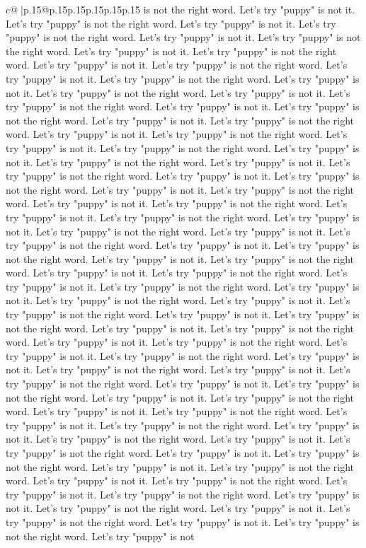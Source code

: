 \documentclass{article}
\begin{document}
{\begin{supertabular}{c@{$\;$}|p{.15\linewidth}@{}p{.15\linewidth}p{.15\linewidth}p{.15\linewidth}p{.15\linewidth}p{.15\linewidth}}
{{{is not the right word. Let's try "puppy" is not it. Let's try "puppy" is not the right word. Let's try "puppy" is not it. Let's try "puppy" is not the right word. Let's try "puppy" is not it. Let's try "puppy" is not the right word. Let's try "puppy" is not it. Let's try "puppy" is not the right word. Let's try "puppy" is not it. Let's try "puppy" is not the right word. Let's try "puppy" is not it. Let's try "puppy" is not the right word. Let's try "puppy" is not it. Let's try "puppy" is not the right word. Let's try "puppy" is not it. Let's try "puppy" is not the right word. Let's try "puppy" is not it. Let's try "puppy" is not the right word. Let's try "puppy" is not it. Let's try "puppy" is not the right word. Let's try "puppy" is not it. Let's try "puppy" is not the right word. Let's try "puppy" is not it. Let's try "puppy" is not the right word. Let's try "puppy" is not it. Let's try "puppy" is not the right word. Let's try "puppy" is not it. Let's try "puppy" is not the right word. Let's try "puppy" is not it. Let's try "puppy" is not the right word. Let's try "puppy" is not it. Let's try "puppy" is not the right word. Let's try "puppy" is not it. Let's try "puppy" is not the right word. Let's try "puppy" is not it. Let's try "puppy" is not the right word. Let's try "puppy" is not it. Let's try "puppy" is not the right word. Let's try "puppy" is not it. Let's try "puppy" is not the right word. Let's try "puppy" is not it. Let's try "puppy" is not the right word. Let's try "puppy" is not it. Let's try "puppy" is not the right word. Let's try "puppy" is not it. Let's try "puppy" is not the right word. Let's try "puppy" is not it. Let's try "puppy" is not the right word. Let's try "puppy" is not it. Let's try "puppy" is not the right word. Let's try "puppy" is not it. Let's try "puppy" is not the right word. Let's try "puppy" is not it. Let's try "puppy" is not the right word. Let's try "puppy" is not it. Let's try "puppy" is not the right word. Let's try "puppy" is not it. Let's try "puppy" is not the right word. Let's try "puppy" is not it. Let's try "puppy" is not the right word. Let's try "puppy" is not it. Let's try "puppy" is not the right word. Let's try "puppy" is not it. Let's try "puppy" is not the right word. Let's try "puppy" is not it. Let's try "puppy" is not the right word. Let's try "puppy" is not it. Let's try "puppy" is not the right word. Let's try "puppy" is not it. Let's try "puppy" is not the right word. Let's try "puppy" is not it. Let's try "puppy" is not the right word. Let's try "puppy" is not it. Let's try "puppy" is not the right word. Let's try "puppy" is not it. Let's try "puppy" is not the right word. Let's try "puppy" is not it. Let's try "puppy" is not the right word. Let's try "puppy" is not it. Let's try "puppy" is not the right word. Let's try "puppy" is not it. Let's try "puppy" is not the right word. Let's try "puppy" is not it. Let's try "puppy" is not the right word. Let's try "puppy" is not it. Let's try "puppy" is not the right word. Let's try "puppy" is not it. Let's try "puppy" is not the right word. Let's try "puppy" is not it. Let's try "puppy" is not the right word. Let's try "puppy" is not }}}
\end{supertabular}}
\end{document}
